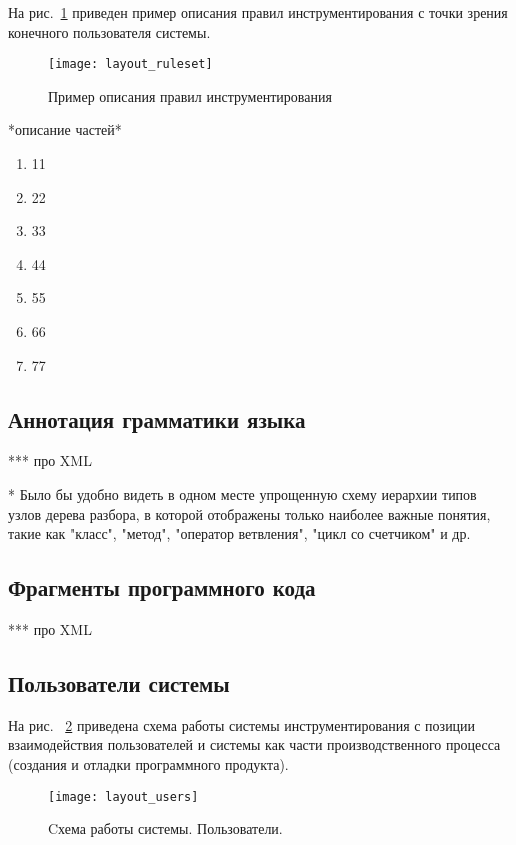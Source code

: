 На рис.~\ref{fig:layout_ruleset} приведен пример описания правил инструментирования с точки зрения конечного пользователя системы.

\begin{figure}[!h]
	\centering
	\texttt{[image: layout\_ruleset]}
	\caption{Пример описания правил инструментирования}
	\label{fig:layout_ruleset}
\end{figure}

*описание частей*
\begin{enumerate}
  \item 11
  \item 22
  \item 33
  \item 44
  \item 55
  \item 66
  \item 77
\end{enumerate}

\subsection{Аннотация грамматики языка}

***
про XML

* Было бы удобно видеть в одном месте упрощенную схему иерархии типов узлов дерева разбора, в которой отображены только наиболее важные понятия, такие как "класс", "метод", "оператор ветвления", "цикл со счетчиком" и др.

\subsection{Фрагменты программного кода}

***
про XML

\subsection{Пользователи системы}

На рис. ~\ref{fig:layout_users} приведена схема работы системы инструментирования с позиции взаимодействия пользователей и системы как части производственного процесса (создания и отладки программного продукта).

\begin{figure}[h]
	\centering
	\texttt{[image: layout\_users]}
	\caption{Cхема работы системы. Пользователи.}
	\label{fig:layout_users}
\end{figure}


